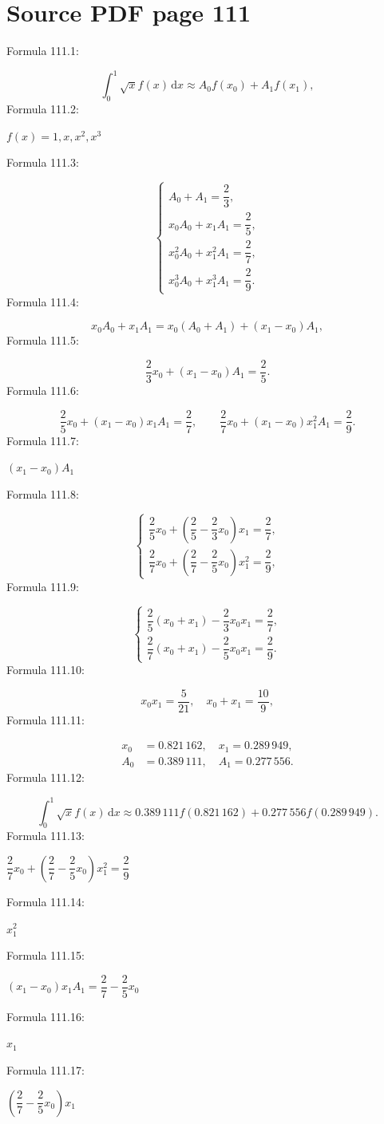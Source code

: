 \documentclass[11pt]{article}
\begin{document}
\section*{Source PDF page 111}
\noindent Formula 111.1:\par
\[
\int_0^1\sqrt{x}f(x)\,\mathrm{d}x\approx A_0f(x_0)+A_1f(x_1),
\tag{4.4.7}
\]
\noindent Formula 111.2:\par
$f(x)=1,x,x^2,x^3$\par
\noindent Formula 111.3:\par
\[
\begin{cases}
A_0+A_1=\dfrac23,\\[5pt]
x_0A_0+x_1A_1=\dfrac25,\\[5pt]
x_0^2A_0+x_1^2A_1=\dfrac27,\\[5pt]
x_0^3A_0+x_1^3A_1=\dfrac29.
\end{cases}
\tag{4.4.8}
\]
\noindent Formula 111.4:\par
\[
x_0A_0+x_1A_1=x_0(A_0+A_1)+(x_1-x_0)A_1,
\]
\noindent Formula 111.5:\par
\[
\frac23x_0+(x_1-x_0)A_1=\frac25.
\]
\noindent Formula 111.6:\par
\[
\frac25x_0+(x_1-x_0)x_1A_1=\frac27,\qquad
\frac27x_0+(x_1-x_0)x_1^2A_1=\frac29.
\]
\noindent Formula 111.7:\par
$(x_1-x_0)A_1$\par
\noindent Formula 111.8:\par
\[
\begin{cases}
\dfrac25x_0+\left(\dfrac25-\dfrac23x_0\right)x_1=\dfrac27,\\[5pt]
\dfrac27x_0+\left(\dfrac27-\dfrac25x_0\right)x_1^2=\dfrac29,
\end{cases}
\]
\noindent Formula 111.9:\par
\[
\begin{cases}
\dfrac25(x_0+x_1)-\dfrac23x_0x_1=\dfrac27,\\[5pt]
\dfrac27(x_0+x_1)-\dfrac25x_0x_1=\dfrac29.
\end{cases}
\]
\noindent Formula 111.10:\par
\[
x_0x_1=\frac5{21},\quad x_0+x_1=\frac{10}9,
\]
\noindent Formula 111.11:\par
\[
\begin{aligned}
x_0&=0.821\,162,\quad x_1=0.289\,949,\\
A_0&=0.389\,111,\quad A_1=0.277\,556.
\end{aligned}
\]
\noindent Formula 111.12:\par
\[
\int_0^1\sqrt{x}f(x)\,\mathrm{d}x
\approx0.389\,111f(0.821\,162)+0.277\,556f(0.289\,949).
\]
\noindent Formula 111.13:\par
$\dfrac27x_0+\left(\dfrac27-\dfrac25x_0\right)x_1^2=\dfrac29$\par
\noindent Formula 111.14:\par
$x_1^2$\par
\noindent Formula 111.15:\par
$(x_1-x_0)x_1A_1=\dfrac27-\dfrac25x_0$\par
\noindent Formula 111.16:\par
$x_1$\par
\noindent Formula 111.17:\par
$\left(\dfrac27-\dfrac25x_0\right)x_1$\par
\clearpage
\end{document}
